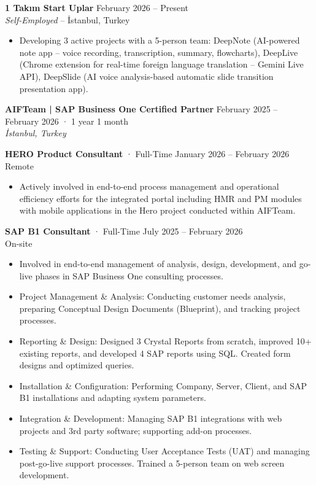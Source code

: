 \documentclass[a4paper,8pt]{article}
\begin{document}
\textbf{1 Takım Start Uplar} \hfill {\small February 2026 -- Present}\\
{\small \textit{Self-Employed} -- İstanbul, Turkey}
\begin{itemize}
\item {\small Developing 3 active projects with a 5-person team: DeepNote (AI-powered note app -- voice recording, transcription, summary, flowcharts), DeepLive (Chrome extension for real-time foreign language translation -- Gemini Live API), DeepSlide (AI voice analysis-based automatic slide transition presentation app).}
\end{itemize}

\vspace{3pt}

\textbf{AIFTeam | SAP Business One Certified Partner} \hfill {\small February 2025 -- February 2026 · 1 year 1 month}\\
{\small \textit{İstanbul, Turkey}}

\vspace{3pt}
{\small \textbf{HERO Product Consultant} · Full-Time \hfill January 2026 -- February 2026}\\
{\small Remote}
\begin{itemize}
\item {\small Actively involved in end-to-end process management and operational efficiency efforts for the integrated portal including HMR and PM modules with mobile applications in the Hero project conducted within AIFTeam.}
\end{itemize}

\vspace{3pt}
{\small \textbf{SAP B1 Consultant} · Full-Time \hfill July 2025 -- February 2026}\\
{\small On-site}
\begin{itemize}
\item {\small Involved in end-to-end management of analysis, design, development, and go-live phases in SAP Business One consulting processes.}
\item {\small Project Management \& Analysis: Conducting customer needs analysis, preparing Conceptual Design Documents (Blueprint), and tracking project processes.}
\item {\small Reporting \& Design: Designed 3 Crystal Reports from scratch, improved 10+ existing reports, and developed 4 SAP reports using SQL. Created form designs and optimized queries.}
\item {\small Installation \& Configuration: Performing Company, Server, Client, and SAP B1 installations and adapting system parameters.}
\item {\small Integration \& Development: Managing SAP B1 integrations with web projects and 3rd party software; supporting add-on processes.}
\item {\small Testing \& Support: Conducting User Acceptance Tests (UAT) and managing post-go-live support processes. Trained a 5-person team on web screen development.}
\end{itemize}
\end{document}
